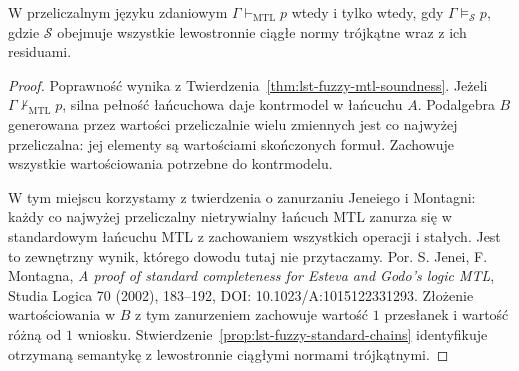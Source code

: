 \begin{twierdzenie}
\label{thm:lst-fuzzy-mtl-standard}
W przeliczalnym języku zdaniowym $\Gamma\vdash_{\mathrm{MTL}}p$
wtedy i tylko wtedy, gdy $\Gamma\models_{\mathcal S}p$,
gdzie $\mathcal S$ obejmuje wszystkie lewostronnie ciągłe
normy trójkątne wraz z ich residuami.
\end{twierdzenie}
\begin{proof}
Poprawność wynika z Twierdzenia~\ref{thm:lst-fuzzy-mtl-soundness}.
Jeżeli $\Gamma\nvdash_{\mathrm{MTL}}p$, silna pełność
łańcuchowa daje kontrmodel w łańcuchu $A$. Podalgebra $B$
generowana przez wartości przeliczalnie wielu zmiennych
jest co najwyżej przeliczalna: jej elementy są wartościami
skończonych formuł. Zachowuje wszystkie wartościowania
potrzebne do kontrmodelu.

W tym miejscu korzystamy z twierdzenia o zanurzaniu
Jeneiego i Montagni: każdy co najwyżej przeliczalny
nietrywialny łańcuch MTL zanurza się w standardowym łańcuchu
MTL z zachowaniem wszystkich operacji i stałych. Jest to
zewnętrzny wynik, którego dowodu tutaj nie przytaczamy.
Por. S. Jenei, F. Montagna, \emph{A proof of standard
completeness for Esteva and Godo's logic MTL},
Studia Logica 70 (2002), 183--192,
DOI: 10.1023/A:1015122331293.
Złożenie wartościowania w $B$ z tym zanurzeniem zachowuje
wartość $1$ przesłanek i wartość różną od $1$ wniosku.
Stwierdzenie~\ref{prop:lst-fuzzy-standard-chains} identyfikuje
otrzymaną semantykę z lewostronnie ciągłymi normami trójkątnymi.
\end{proof}

